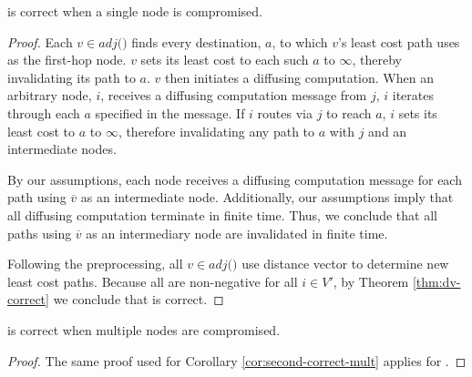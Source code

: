 \begin{corollary}
\label{cor:purge-correct-single}
\purge is correct when a single node is compromised.
\end{corollary}
\begin{proof}
Each $v \in adj($\bads$)$ finds every destination, $a$, to which $v$'s least cost path 
uses \bad as the first-hop node. $v$ sets its least cost to each such $a$ to $\infty$, thereby invalidating its path to $a$.  
$v$ then initiates a diffusing computation. When an arbitrary node, $i$, receives a diffusing computation message from $j$, $i$ iterates 
through each $a$ specified in the message. If
$i$ routes via $j$ to reach $a$, $i$ sets its least cost to $a$ to $\infty$, therefore invalidating any path to $a$ with $j$ and  
\bad an intermediate nodes.  

By our assumptions, each node receives a diffusing computation message for each path using $\overline{v}$ as an intermediate node.  Additionally, our assumptions imply that all
diffusing computation terminate in finite time. 
Thus, we conclude that all paths using $\overline{v}$ as an intermediary node are invalidated in finite time. 

Following the preprocessing, all $v \in adj($\bads$)$ use
distance vector to determine new least cost paths. Because all \dmatrixi are non-negative for all $i \in V'$, by Theorem \ref{thm:dv-correct} we conclude that \purge is correct. 
\end{proof}

\begin{corollary}
\label{cor:purge-correct-mult}
\purge is correct when multiple nodes are compromised.
\end{corollary}
\begin{proof}
The same proof used for Corollary \ref{cor:second-correct-mult} applies for \purges.
\end{proof}

